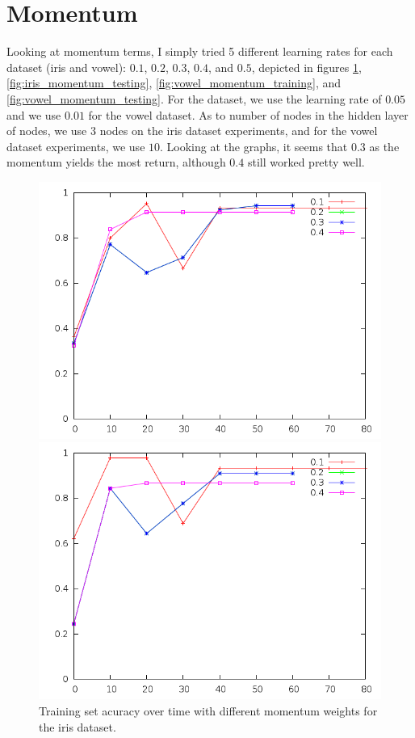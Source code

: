 \documentclass[12pt]{article}
\begin{document}
\section{Momentum}
Looking at momentum terms, I simply tried 5 different learning rates for each
dataset (iris and vowel): $0.1$, $0.2$, $0.3$, $0.4$, and $0.5$, depicted in
figures \ref{fig:iris_momentum_training},
\ref{fig:iris_momentum_testing},
\ref{fig:vowel_momentum_training}, and
\ref{fig:vowel_momentum_testing}. For the dataset, we use the learning rate of
$0.05$ and we use $0.01$ for the vowel dataset. As to number of nodes in the
hidden layer of nodes, we use $3$ nodes on the iris dataset experiments, and for
the vowel dataset experiments, we use $10$.
Looking at the graphs, it seems that $0.3$ as the momentum yields the most
return, although $0.4$ still worked pretty well.
\begin{figure}[!ht]
    \centering
    \begin{minipage}[b]{0.45\linewidth}
        \includegraphics[width=1.0\textwidth]{iris-momentum-training}
        \caption{Training set acuracy over time with different momentum weights for the iris dataset.}
        \label{fig:iris_momentum_training}
    \end{minipage}
    \quad
    \begin{minipage}[b]{0.45\linewidth}
        \includegraphics[width=1.0\textwidth]{iris-momentum-testing}

\end{minipage}
\end{figure}
\end{document}
